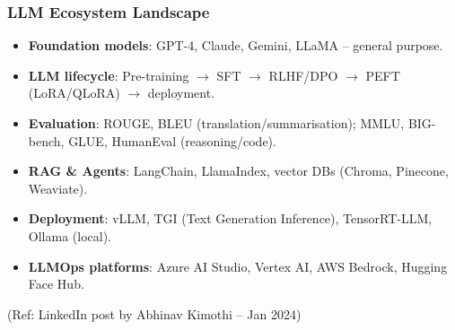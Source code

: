 \begin{frame}[fragile]\frametitle{LLM Ecosystem Landscape}
\begin{itemize}
\item \textbf{Foundation models}: GPT-4, Claude, Gemini, LLaMA – general purpose.
\item \textbf{LLM lifecycle}: Pre-training $\rightarrow$ SFT $\rightarrow$ RLHF/DPO $\rightarrow$ PEFT (LoRA/QLoRA) $\rightarrow$ deployment.
\item \textbf{Evaluation}: ROUGE, BLEU (translation/summarisation); MMLU, BIG-bench, GLUE, HumanEval (reasoning/code).
\item \textbf{RAG \& Agents}: LangChain, LlamaIndex, vector DBs (Chroma, Pinecone, Weaviate).
\item \textbf{Deployment}: vLLM, TGI (Text Generation Inference), TensorRT-LLM, Ollama (local).
\item \textbf{LLMOps platforms}: Azure AI Studio, Vertex AI, AWS Bedrock, Hugging Face Hub.
\end{itemize}
{\tiny (Ref: LinkedIn post by Abhinav Kimothi – Jan 2024)}
\end{frame}

